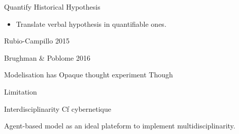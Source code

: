 \documentclass[12pt, notes=show]{beamer}
\begin{document}
\begin{frame}{Quantify Historical Hypothesis}
	\begin{itemize}
		\item Translate verbal hypothesis in quantifiable ones.
	\end{itemize}

Rubio-Campillo 2015

	
\end{frame}

\begin{frame}
	Brughman \& Poblome 2016
\end{frame}


\begin{frame}
	Modelisation has Opaque thought experiment Though 
\end{frame}

\begin{frame}{Limitation}
\end{frame}

\begin{frame}{Interdisciplinarity}
	Cf cybernetique
\end{frame}


\begin{frame}
	Agent-based model as an ideal plateform to implement multidisciplinarity.
\end{frame}
\end{document}
